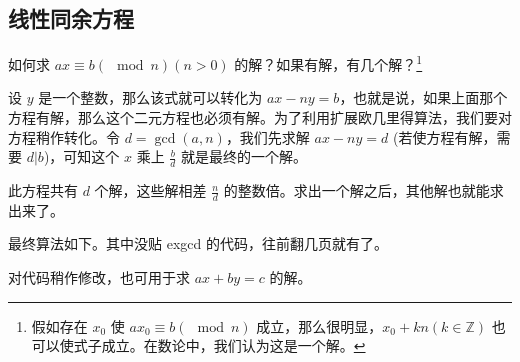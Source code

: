\subsection{线性同余方程}
	如何求 $ax\equiv b(\mod n)(n>0)$ 的解？如果有解，有几个解？\footnote{假如存在 $x_{0}$ 使 $ax_{0}\equiv b(\mod n)$ 成立，那么很明显，$x_{0}+kn(k\in {\mathbb  {Z}})$ 也可以使式子成立。在数论中，我们认为这是一个解。}
	
	设 $y$ 是一个整数，那么该式就可以转化为 $ax-ny=b$，也就是说，如果上面那个方程有解，那么这个二元方程也必须有解。为了利用扩展欧几里得算法，我们要对方程稍作转化。令 $d=\gcd(a,n)$，我们先求解 $ax-ny=d$ (若使方程有解，需要 $d|b$)，可知这个 $x$ 乘上 $\frac  {b}{d}$ 就是最终的一个解。
	
	此方程共有 $d$ 个解，这些解相差 $\frac{n}{d}$ 的整数倍。求出一个解之后，其他解也就能求出来了。
	
	最终算法如下。其中没贴 exgcd 的代码，往前翻几页就有了。
	
	
	
	对代码稍作修改，也可用于求 $ax+by=c$ 的解。